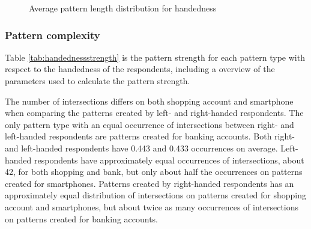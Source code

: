       \begin{figure}[H]
      	\centering
      	\caption{Average pattern length distribution for handedness}
      	\label{fig:avgpatterndisthandedness}
      \end{figure}

    \subsubsection{Pattern complexity}

      Table \ref{tab:handednessstrength} is the pattern strength for each pattern type with respect to the handedness of the respondents, including a overview of the parameters used to calculate the pattern strength. 

      The number of intersections differs on both shopping account and smartphone when comparing the patterns created by left- and right-handed respondents. The only pattern type with an equal occurrence of intersections between right- and left-handed respondents are patterns created for banking accounts. Both right- and left-handed respondents have 0.443 and 0.433 occurrences on average. Left-handed respondents have approximately equal occurrences of intersections, about 42, for both shopping and bank, but only about half the occurrences on patterns created for smartphones. Patterns created by right-handed respondents has an approximately equal distribution of intersections on patterns created for shopping account and smartphones, but about twice as many occurrences of intersections on patterns created for banking accounts.

